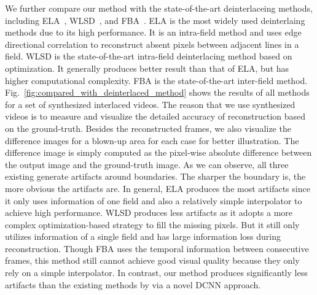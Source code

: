 We further compare our method with the state-of-the-art deinterlaceing methods, including ELA~\cite{doyle1990interlaced},
WLSD~\cite{wang2014interlacing}, and FBA~\cite{vedadi2013interlacing}.
ELA is the most widely used deinterlaing methods due to its high performance. It is an intra-field method and uses edge directional correlation to reconstruct absent pixels between adjacent lines in a field. WLSD is the state-of-the-art intra-field deinterlacing method based on optimization. It generally produces better result than that of ELA, but has higher computational complexity. FBA is the state-of-the-art inter-field method.
Fig.~\ref{fig:compared_with_deinterlaced_method} shows the results of all methods for a set of synthesized interlaced videos. The reason that we use synthesized videos is to measure and visualize the detailed accuracy of reconstruction based on the ground-truth. Besides the reconstructed frames, we also visualize the difference images for a blown-up area for each case for better illustration. The difference image is simply computed as the pixel-wise absolute difference between the output image and the ground-truth image. As we can observe, all three existing generate artifacts around boundaries. The sharper the boundary is, the more obvious the artifacts are. In general, ELA produces the most artifacts since it only uses information of one field and also a relatively simple interpolator to achieve high performance. WLSD produces less artifacts as it adopts a more complex optimization-based strategy to fill the missing pixels. But it still only utilizes information of a single field and has large information loss during reconstruction. Though FBA uses the temporal information between consecutive frames, this method still cannot achieve good visual quality because they only rely on a simple interpolator. In contrast, our method produces significantly less artifacts than the existing methods by via a novel DCNN approach. 



